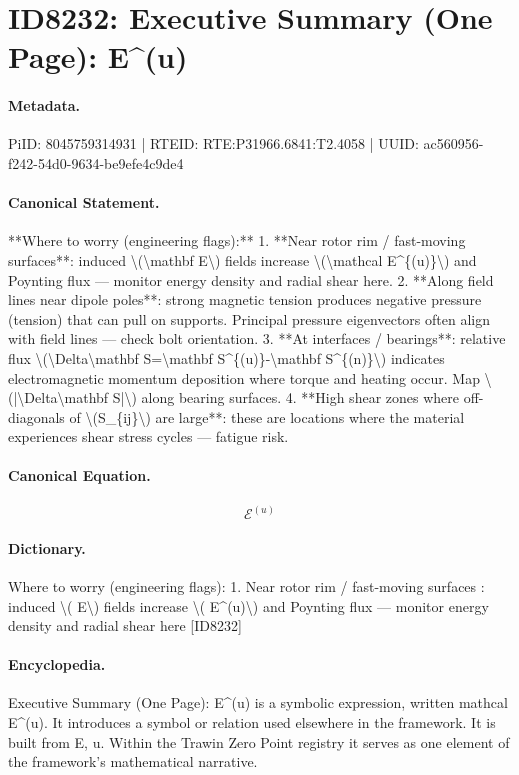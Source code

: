 \section*{ID8232: Executive Summary (One Page): E\textasciicircum{}(u)}
\paragraph{Metadata.}
PiID: 8045759314931 | RTEID: RTE:P31966.6841:T2.4058 | UUID: ac560956-f242-54d0-9634-be9efe4c9de4

\paragraph{Canonical Statement.}
**Where to worry (engineering flags):** 1. **Near rotor rim / fast-moving surfaces**: induced \textbackslash{}(\textbackslash{}mathbf E\textbackslash{}) fields increase \textbackslash{}(\textbackslash{}mathcal E\textasciicircum{}\{(u)\}\textbackslash{}) and Poynting flux — monitor energy density and radial shear here. 2. **Along field lines near dipole poles**: strong magnetic tension produces negative pressure (tension) that can pull on supports. Principal pressure eigenvectors often align with field lines — check bolt orientation. 3. **At interfaces / bearings**: relative flux \textbackslash{}(\textbackslash{}Delta\textbackslash{}mathbf S=\textbackslash{}mathbf S\textasciicircum{}\{(u)\}-\textbackslash{}mathbf S\textasciicircum{}\{(n)\}\textbackslash{}) indicates electromagnetic momentum deposition where torque and heating occur. Map \textbackslash{}(|\textbackslash{}Delta\textbackslash{}mathbf S|\textbackslash{}) along bearing surfaces. 4. **High shear zones where off-diagonals of \textbackslash{}(S\_\{ij\}\textbackslash{}) are large**: these are locations where the material experiences shear stress cycles — fatigue risk.

\paragraph{Canonical Equation.}
\[
\mathcal E^{(u)}
\]

\paragraph{Dictionary.}
Where to worry (engineering flags): 1. Near rotor rim / fast-moving surfaces : induced \textbackslash{}( E\textbackslash{}) fields increase \textbackslash{}( E\textasciicircum{}(u)\textbackslash{}) and Poynting flux — monitor energy density and radial shear here [ID8232]

\paragraph{Encyclopedia.}
Executive Summary (One Page): E\textasciicircum{}(u) is a symbolic expression, written mathcal E\textasciicircum{}(u). It introduces a symbol or relation used elsewhere in the framework. It is built from E, u. Within the Trawin Zero Point registry it serves as one element of the framework's mathematical narrative.

